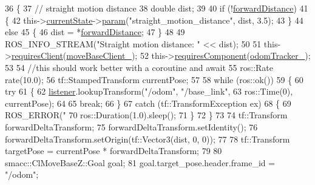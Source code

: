 \begin{DoxyCode}
36     \{
37         \textcolor{comment}{// straight motion distance}
38         \textcolor{keywordtype}{double} dist;
39 
40         \textcolor{keywordflow}{if} (!\hyperlink{classsm__dance__bot_1_1CbNavigateForward_af150b8fb72f2a27b6fef85b6f169b91b}{forwardDistance})
41         \{
42             this->\hyperlink{classsmacc_1_1SmaccClientBehavior_af76fc9b877542ed5caf033f820c107d0}{currentState}->\hyperlink{classsmacc_1_1ISmaccState_a4982f2187ed6da337462721146e8ef70}{param}(\textcolor{stringliteral}{"straight\_motion\_distance"}, dist, 3.5);
43         \}
44         \textcolor{keywordflow}{else}
45         \{
46             dist = *\hyperlink{classsm__dance__bot_1_1CbNavigateForward_af150b8fb72f2a27b6fef85b6f169b91b}{forwardDistance};
47         \}
48 
49         ROS\_INFO\_STREAM(\textcolor{stringliteral}{"Straight motion distance: "} << dist);
50 
51         this->\hyperlink{classsmacc_1_1SmaccClientBehavior_adc21bbd45d36bd81ca6f778ed161807a}{requiresClient}(\hyperlink{classsm__dance__bot_1_1CbNavigateForward_aa8925dbb246e8decc95e226818fa63ea}{moveBaseClient\_});
52         this->\hyperlink{classsmacc_1_1SmaccClientBehavior_a011246bb1424f8bf8c9322f652db9d88}{requiresComponent}(\hyperlink{classsm__dance__bot_1_1CbNavigateForward_ab85e95221e19ed988e0113f5f6ad96c2}{odomTracker\_});
53 
54         \textcolor{comment}{//this should work better with a coroutine and await}
55         ros::Rate rate(10.0);
56         tf::StampedTransform currentPose;
57 
58         \textcolor{keywordflow}{while} (ros::ok())
59         \{
60             \textcolor{keywordflow}{try}
61             \{
62                 \hyperlink{classsm__dance__bot_1_1CbNavigateForward_a7bda457757f10a2e71eb15c07bf707b4}{listener}.lookupTransform(\textcolor{stringliteral}{"/odom"}, \textcolor{stringliteral}{"/base\_link"},
63                                          ros::Time(0), currentPose);
64 
65                 \textcolor{keywordflow}{break};
66             \}
67             \textcolor{keywordflow}{catch} (tf::TransformException ex)
68             \{
69                 ROS\_ERROR(\textcolor{stringliteral}{"%
70                 ros::Duration(1.0).sleep();
71             \}
72         \}
73 
74         tf::Transform forwardDeltaTransform;
75         forwardDeltaTransform.setIdentity();
76         forwardDeltaTransform.setOrigin(tf::Vector3(dist, 0, 0));
77 
78         tf::Transform targetPose = currentPose * forwardDeltaTransform;
79 
80         smacc::ClMoveBaseZ::Goal goal;
81         goal.target\_pose.header.frame\_id = \textcolor{stringliteral}{"/odom"};
}
\end{DoxyCode}
